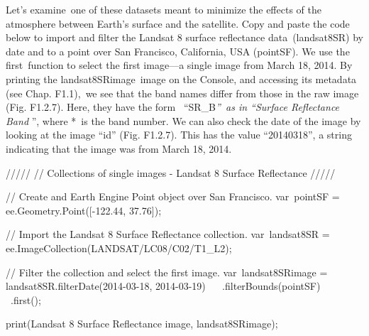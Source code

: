 \documentclass[
  letterpaper,
  DIV=11,
  numbers=noendperiod]{scrreprt}
\newenvironment{Shaded}{\begin{snugshade}}{\end{snugshade}}
\newcommand{\AttributeTok}[1]{\textcolor[rgb]{0.40,0.45,0.13}{#1}}
\newcommand{\CommentTok}[1]{\textcolor[rgb]{0.37,0.37,0.37}{#1}}
\newcommand{\FloatTok}[1]{\textcolor[rgb]{0.68,0.00,0.00}{#1}}
\newcommand{\FunctionTok}[1]{\textcolor[rgb]{0.28,0.35,0.67}{#1}}
\newcommand{\NormalTok}[1]{\textcolor[rgb]{0.00,0.23,0.31}{#1}}
\newcommand{\OperatorTok}[1]{\textcolor[rgb]{0.37,0.37,0.37}{#1}}
\newcommand{\StringTok}[1]{\textcolor[rgb]{0.13,0.47,0.30}{#1}}
\begin{document}
Let's examine~one of these datasets meant to minimize the effects of the
atmosphere between Earth's surface and the satellite. Copy and paste the
code below to import and filter the Landsat 8 surface reflectance
data~(landsat8SR) by date and to a point over San Francisco, California,
USA (pointSF). We use the first~function to select the first image---a
single image from March 18, 2014. By printing the landsat8SRimage~image
on the Console, and accessing its metadata (see Chap. F1.1),~we see that
the band names differ from those in the raw image (Fig. F1.2.7). Here,
they have the form ~``SR\_B\emph{''~as in ``Surface Reflectance Band
}'', where *~is the band number. We can also check the date of the image
by looking at the image ``id'' (Fig. F1.2.7). This has the value
``20140318'', a string indicating that the image was from March 18,
2014.

\begin{Shaded}
\begin{Highlighting}[]
\CommentTok{/////  }
\CommentTok{// Collections of single images {-} Landsat 8 Surface Reflectance  }
\CommentTok{/////  }
  
\CommentTok{// Create and Earth Engine Point object over San Francisco.  }
\NormalTok{var pointSF }\OperatorTok{=}\NormalTok{ ee}\OperatorTok{.}\AttributeTok{Geometry}\OperatorTok{.}\FunctionTok{Point}\NormalTok{([}\OperatorTok{{-}}\FloatTok{122.44}\OperatorTok{,} \FloatTok{37.76}\NormalTok{])}\OperatorTok{;}  
  
\CommentTok{// Import the Landsat 8 Surface Reflectance collection.  }
\NormalTok{var landsat8SR }\OperatorTok{=}\NormalTok{ ee}\OperatorTok{.}\FunctionTok{ImageCollection}\NormalTok{(}\StringTok{\textquotesingle{}LANDSAT/LC08/C02/T1\_L2\textquotesingle{}}\NormalTok{)}\OperatorTok{;}  
  
\CommentTok{// Filter the collection and select the first image.  }
\NormalTok{var landsat8SRimage }\OperatorTok{=}\NormalTok{ landsat8SR}\OperatorTok{.}\FunctionTok{filterDate}\NormalTok{(}\StringTok{\textquotesingle{}2014{-}03{-}18\textquotesingle{}}\OperatorTok{,} \StringTok{\textquotesingle{}2014{-}03{-}19\textquotesingle{}}\NormalTok{)  }
  \AttributeTok{ }\OperatorTok{.}\FunctionTok{filterBounds}\NormalTok{(pointSF)  }
  \AttributeTok{ }\OperatorTok{.}\FunctionTok{first}\NormalTok{()}\OperatorTok{;}  
  
\FunctionTok{print}\NormalTok{(}\StringTok{\textquotesingle{}Landsat 8 Surface Reflectance image\textquotesingle{}}\OperatorTok{,}\NormalTok{ landsat8SRimage)}\OperatorTok{;}
\end{Highlighting}
\end{Shaded}
\end{document}
